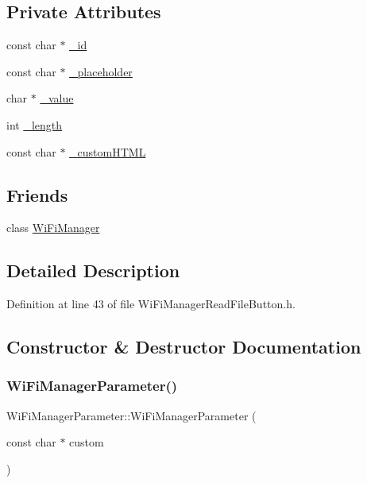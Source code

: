 \subsection*{Private Attributes}
\begin{DoxyCompactItemize}
\item 
const char $\ast$ \hyperlink{class_wi_fi_manager_parameter_a2b468d83df6e0714c18a38f09e7996ed}{\+\_\+id}
\item 
const char $\ast$ \hyperlink{class_wi_fi_manager_parameter_aceb6003c96280319fb19f83ebaf3034b}{\+\_\+placeholder}
\item 
char $\ast$ \hyperlink{class_wi_fi_manager_parameter_a80c6492e74603e4df46219b23580ecb6}{\+\_\+value}
\item 
int \hyperlink{class_wi_fi_manager_parameter_a30ca2df3654651a1b5320261a061b774}{\+\_\+length}
\item 
const char $\ast$ \hyperlink{class_wi_fi_manager_parameter_a3823cb117da1a75860cc3e81b0c6f80d}{\+\_\+custom\+H\+T\+ML}
\end{DoxyCompactItemize}
\subsection*{Friends}
\begin{DoxyCompactItemize}
\item 
class \hyperlink{class_wi_fi_manager_parameter_a56d1e08e3880a330575332abac06e6c8}{Wi\+Fi\+Manager}
\end{DoxyCompactItemize}


\subsection{Detailed Description}


Definition at line 43 of file Wi\+Fi\+Manager\+Read\+File\+Button.\+h.



\subsection{Constructor \& Destructor Documentation}
\mbox{\label{class_wi_fi_manager_parameter_a6e9da46ea712de5d61449098414a3b66}} 
\subsubsection{\texorpdfstring{Wi\+Fi\+Manager\+Parameter()}{WiFiManagerParameter()}\hspace{0.1cm}{\footnotesize\ttfamily [1/3]}}
{\footnotesize\ttfamily Wi\+Fi\+Manager\+Parameter\+::\+Wi\+Fi\+Manager\+Parameter (\begin{DoxyParamCaption}\item[{const char $\ast$}]{custom }\end{DoxyParamCaption})}



